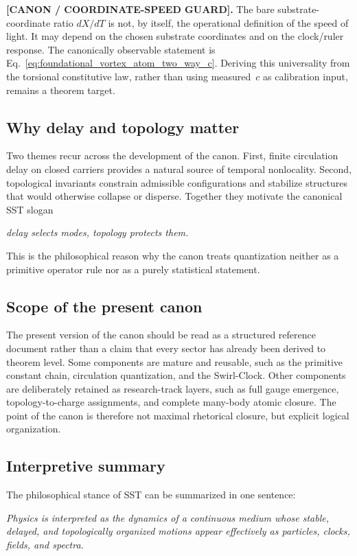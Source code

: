 \documentclass[11pt]{article}
\theoremstyle{definition}
\theoremstyle{plain}
\theoremstyle{remark}
\begin{document}
        \textbf{[CANON / COORDINATE-SPEED GUARD].}
        The bare substrate-coordinate ratio \(dX/dT\) is not, by itself, the operational definition of the speed of light. It may depend on the chosen substrate coordinates and on the clock/ruler response. The canonically observable statement is Eq.~\eqref{eq:foundational_vortex_atom_two_way_c}. Deriving this universality from the torsional constitutive law, rather than using measured~\(c\) as calibration input, remains a theorem target.

    \subsection{Why delay and topology matter}
        Two themes recur across the development of the canon.
        First, finite circulation delay on closed carriers provides a natural source of temporal nonlocality. Second, topological invariants constrain admissible configurations and stabilize structures that would otherwise collapse or disperse. Together they motivate the canonical SST slogan
        \begin{center}
            \textit{delay selects modes, topology protects them.}
        \end{center}
        This is the philosophical reason why the canon treats quantization neither as a primitive operator rule nor as a purely statistical statement.

    \subsection{Scope of the present canon}
        The present version of the canon should be read as a structured reference document rather than a claim that every sector has already been derived to theorem level. Some components are mature and reusable, such as the primitive constant chain, circulation quantization, and the Swirl-Clock. Other components are deliberately retained as research-track layers, such as full gauge emergence, topology-to-charge assignments, and complete many-body atomic closure. The point of the canon is therefore not maximal rhetorical closure, but explicit logical organization.

    \subsection{Interpretive summary}
        The philosophical stance of SST can be summarized in one sentence:
        \begin{center}
            \textit{Physics is interpreted as the dynamics of a continuous medium whose stable, delayed, and topologically organized motions appear effectively as particles, clocks, fields, and spectra.}
        \end{center}
\end{document}
